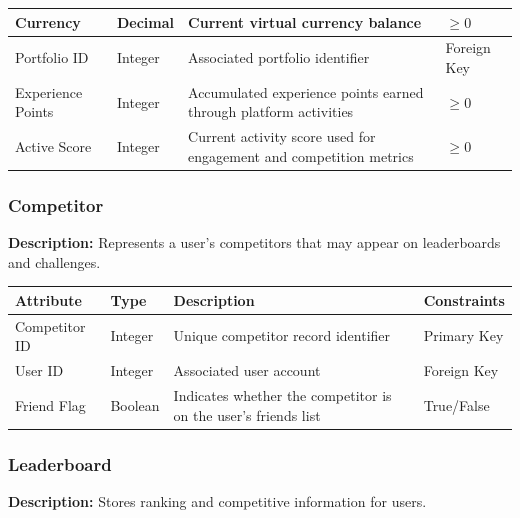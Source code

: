\documentclass[12pt]{article}
\begin{document}
\begin{xltabular}{\textwidth}{|p{3cm}|p{2cm}|X|p{3cm}|}
    Currency & Decimal & Current virtual currency balance & $\geq 0$ \\ 
    \hline 
    
    Portfolio ID & Integer & Associated portfolio identifier & Foreign Key \\ 
    \hline 
    
    Experience Points & Integer & Accumulated experience points earned through platform activities & $\geq 0$ \\ 
    \hline 
    
    Active Score & Integer & Current activity score used for engagement and competition metrics & $\geq 0$ \\ 
    \hline 
\end{xltabular}

\subsubsection{Competitor} 

\textbf{Description:} Represents a user's competitors that may appear on leaderboards and challenges. 

\begin{xltabular}{\textwidth}{|p{3cm}|p{2cm}|X|p{3cm}|} 
    \hline 
    \textbf{Attribute} & \textbf{Type} & \textbf{Description} & \textbf{Constraints} \\ 
    \hline 
    
    Competitor ID & Integer & Unique competitor record identifier & Primary Key \\ 
    \hline 
    
    User ID & Integer & Associated user account & Foreign Key \\ 
    \hline 
    
    Friend Flag & Boolean & Indicates whether the competitor is on the user's friends list & True/False \\ 
    \hline 
\end{xltabular}

\subsubsection{Leaderboard} 

\textbf{Description:} Stores ranking and competitive information for users. 
\end{document}
